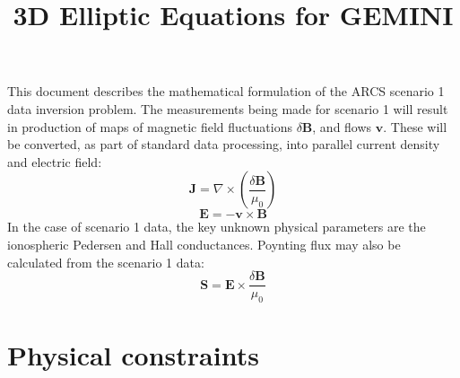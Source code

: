 \documentclass[11pt,letterpaper]{article}
\begin{document}
\setlength{\parindent}{0mm}
\setlength{\parskip}{0.4cm}




\title{3D Elliptic Equations for GEMINI}

\maketitle

\tableofcontents

\pagebreak


This document describes the mathematical formulation of the ARCS scenario 1 data inversion problem.  The measurements being made for scenario 1 will result in production of maps of magnetic field fluctuations $\delta \mathbf{B}$, and flows $\mathbf{v}$.  These will be converted, as part of standard data processing, into parallel current density and electric field:
\begin{equation}
\mathbf{J} = \nabla \times \left( \frac{\delta \mathbf{B}}{\mu_0} \right)
\end{equation}
\begin{equation}
\mathbf{E} = -\mathbf{v} \times \mathbf{B}
\end{equation}
In the case of scenario 1 data, the key unknown physical parameters are the ionospheric Pedersen and Hall conductances.  Poynting flux may also be calculated from the scenario 1 data:
\begin{equation}
\mathbf{S} = \mathbf{E} \times \frac{\delta \mathbf{B}}{\mu_0}
\end{equation}


\section{Physical constraints}
\end{document}
